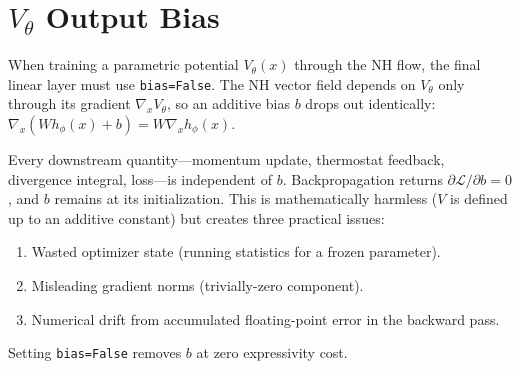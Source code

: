 \documentclass[11pt]{article}
\begin{document}
\section{$V_\theta$ Output Bias}
\label{app:vtheta_bias}

When training a parametric potential $V_\theta(x)$ through the NH flow, the
final linear layer must use \texttt{bias=False}. The NH vector field depends on
$V_\theta$ only through its gradient $\nabla_x V_\theta$, so an additive bias
$b$ drops out identically:
$\nabla_x (W h_\phi(x) + b) = W \nabla_x h_\phi(x)$.

Every downstream quantity---momentum update, thermostat feedback, divergence
integral, loss---is independent of $b$. Backpropagation returns
$\partial \mathcal{L}/\partial b = 0$, and $b$ remains at its initialization.
This is mathematically harmless ($V$ is defined up to an additive constant)
but creates three practical issues:
\begin{enumerate}[leftmargin=*, itemsep=1pt]
  \item Wasted optimizer state (running statistics for a frozen parameter).
  \item Misleading gradient norms (trivially-zero component).
  \item Numerical drift from accumulated floating-point error in the backward
    pass.
\end{enumerate}
Setting \texttt{bias=False} removes $b$ at zero expressivity cost.
\end{document}
